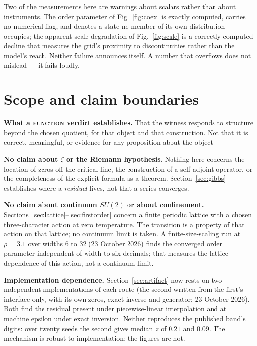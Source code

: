 \documentclass[11pt]{article}
\theoremstyle{remark}
\newcommand{\tier}[1]{\textsc{\MakeLowercase{#1}}}
\begin{document}
Two of the measurements here are warnings about scalars rather than about instruments.
The order parameter of Fig.~\ref{fig:coex} is exactly computed, carries no numerical
flag, and denotes a state no member of its own distribution occupies; the apparent
scale-degradation of Fig.~\ref{fig:scale} is a correctly computed decline that measures
the grid's proximity to discontinuities rather than the model's reach. Neither failure
announces itself. A number that overflows does not mislead --- it fails loudly.

\section{Scope and claim boundaries}\label{sec:scope}

\textbf{What a \tier{FUNCTION} verdict establishes.} That the witness responds to
structure beyond the chosen quotient, for that object and that construction. Not that it
is correct, meaningful, or evidence for any proposition about the object.

\textbf{No claim about $\zeta$ or the Riemann hypothesis.} Nothing here concerns the
location of zeros off the critical line, the construction of a self-adjoint operator, or
the completeness of the explicit formula as a theorem. Section~\ref{sec:gibbs}
establishes where a \emph{residual} lives, not that a series converges.

\textbf{No claim about continuum $SU(2)$ or about confinement.}
Sections~\ref{sec:lattice}--\ref{sec:firstorder} concern a finite periodic lattice with
a chosen three-character action at zero temperature. The transition is a property of
that action on that lattice; no continuum limit is taken. A finite-size-scaling run at
$\rho=3.1$ over widths $6$ to $32$ (23 October 2026) finds the converged order parameter
independent of width to six decimals; that measures the lattice dependence of this action,
not a continuum limit.

\textbf{Implementation dependence.} Section~\ref{sec:artifact} now rests on two independent
implementations of each route (the second written from the first's interface only, with
its own zeros, exact inverse and generator; 23 October 2026). Both find the residual
present under piecewise-linear interpolation and at machine epsilon under exact inversion.
Neither reproduces the published band's digits: over twenty seeds the second gives median
$z$ of $0.21$ and $0.09$. The mechanism is robust to implementation; the figures are not.
\end{document}
